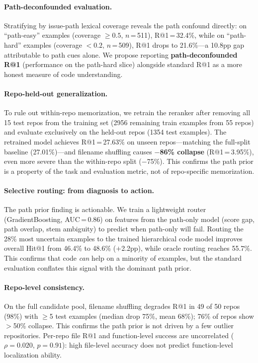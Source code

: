 \documentclass{article}
\begin{document}
\paragraph{Path-deconfounded evaluation.}
Stratifying by issue-path lexical coverage reveals the path confound directly: on ``path-easy'' examples (coverage $\geq 0.5$, $n$\,=\,511), R@1\,=\,32.4\%, while on ``path-hard'' examples (coverage $< 0.2$, $n$\,=\,509), R@1 drops to 21.6\%---a 10.8pp gap attributable to path cues alone.
We propose reporting \textbf{path-deconfounded R@1} (performance on the path-hard slice) alongside standard R@1 as a more honest measure of code understanding.

\paragraph{Repo-held-out generalization.}
To rule out within-repo memorization, we retrain the reranker after removing all 15 test repos from the training set (2956 remaining train examples from 55 repos) and evaluate exclusively on the held-out repos (1354 test examples).
The retrained model achieves R@1\,=\,27.63\% on unseen repos---matching the full-split baseline (27.01\%)---and filename shuffling causes \textbf{$-$86\% collapse} (R@1\,=\,3.95\%), even more severe than the within-repo split ($-$75\%).
This confirms the path prior is a property of the task and evaluation metric, not of repo-specific memorization.

\paragraph{Selective routing: from diagnosis to action.}
The path prior finding is actionable.
We train a lightweight router (GradientBoosting, AUC\,=\,0.86) on features from the path-only model (score gap, path overlap, stem ambiguity) to predict when path-only will fail.
Routing the 28\% most uncertain examples to the trained hierarchical code model improves overall Hit@1 from 46.4\% to 48.6\% ($+$2.2pp), while oracle routing reaches 55.7\%.
This confirms that code \emph{can} help on a minority of examples, but the standard evaluation conflates this signal with the dominant path prior.

\paragraph{Repo-level consistency.}
On the full candidate pool, filename shuffling degrades R@1 in 49 of 50 repos (98\%) with $\geq$5 test examples (median drop 75\%, mean 68\%); 76\% of repos show $>$50\% collapse.
This confirms the path prior is not driven by a few outlier repositories.
Per-repo file R@1 and function-level success are uncorrelated ($\rho = 0.020$, $p = 0.91$): high file-level accuracy does not predict function-level localization ability.
\end{document}
